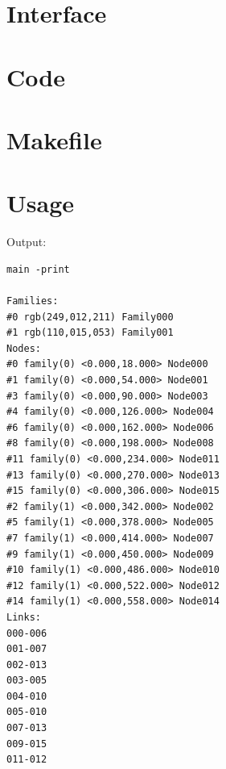 \documentclass[12pt, a4paper]{article}
\begin{document}
\section{Interface}

\begin{scriptsize}
\begin{ttfamily}

\end{ttfamily}
\end{scriptsize}

\section{Code}

\begin{scriptsize}
\begin{ttfamily}

\end{ttfamily}
\end{scriptsize}

\section{Makefile}

\begin{scriptsize}
\begin{ttfamily}

\end{ttfamily}
\end{scriptsize}

\section{Usage}

\begin{scriptsize}
\begin{ttfamily}

\end{ttfamily}
\end{scriptsize}

Output:\\

\begin{scriptsize}
\begin{ttfamily}
\begin{lstlisting}
main -print

Families:
#0 rgb(249,012,211) Family000
#1 rgb(110,015,053) Family001
Nodes:
#0 family(0) <0.000,18.000> Node000
#1 family(0) <0.000,54.000> Node001
#3 family(0) <0.000,90.000> Node003
#4 family(0) <0.000,126.000> Node004
#6 family(0) <0.000,162.000> Node006
#8 family(0) <0.000,198.000> Node008
#11 family(0) <0.000,234.000> Node011
#13 family(0) <0.000,270.000> Node013
#15 family(0) <0.000,306.000> Node015
#2 family(1) <0.000,342.000> Node002
#5 family(1) <0.000,378.000> Node005
#7 family(1) <0.000,414.000> Node007
#9 family(1) <0.000,450.000> Node009
#10 family(1) <0.000,486.000> Node010
#12 family(1) <0.000,522.000> Node012
#14 family(1) <0.000,558.000> Node014
Links:
000-006
001-007
002-013
003-005
004-010
005-010
007-013
009-015
011-012
\end{lstlisting}
\end{ttfamily}
\end{scriptsize}
\end{document}
